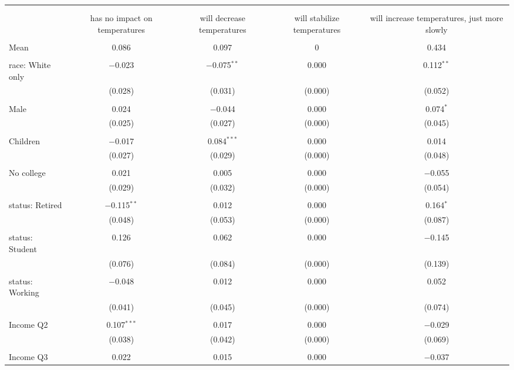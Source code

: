 
\begin{tabular}{@{\extracolsep{5pt}}lcccc} 
\\[-1.8ex]\hline 
\hline \\[-1.8ex] 
\\[-1.8ex] & has no impact on temperatures & will decrease temperatures & will stabilize temperatures & will increase temperatures, just more slowly \\ 
\hline \\[-1.8ex] 
 Mean & 0.086 & 0.097 & 0 & 0.434  \\ \hline \\[-1.8ex] race: White only & $-$0.023 & $-$0.075$^{**}$ & 0.000 & 0.112$^{**}$ \\ 
  & (0.028) & (0.031) & (0.000) & (0.052) \\ 
  & & & & \\ 
 Male & 0.024 & $-$0.044 & 0.000 & 0.074$^{*}$ \\ 
  & (0.025) & (0.027) & (0.000) & (0.045) \\ 
  & & & & \\ 
 Children & $-$0.017 & 0.084$^{***}$ & 0.000 & 0.014 \\ 
  & (0.027) & (0.029) & (0.000) & (0.048) \\ 
  & & & & \\ 
 No college & 0.021 & 0.005 & 0.000 & $-$0.055 \\ 
  & (0.029) & (0.032) & (0.000) & (0.054) \\ 
  & & & & \\ 
 status: Retired & $-$0.115$^{**}$ & 0.012 & 0.000 & 0.164$^{*}$ \\ 
  & (0.048) & (0.053) & (0.000) & (0.087) \\ 
  & & & & \\ 
 status: Student & 0.126 & 0.062 & 0.000 & $-$0.145 \\ 
  & (0.076) & (0.084) & (0.000) & (0.139) \\ 
  & & & & \\ 
 status: Working & $-$0.048 & 0.012 & 0.000 & 0.052 \\ 
  & (0.041) & (0.045) & (0.000) & (0.074) \\ 
  & & & & \\ 
 Income Q2 & 0.107$^{***}$ & 0.017 & 0.000 & $-$0.029 \\ 
  & (0.038) & (0.042) & (0.000) & (0.069) \\ 
  & & & & \\ 
 Income Q3 & 0.022 & 0.015 & 0.000 & $-$0.037 \\ 

\end{tabular}
